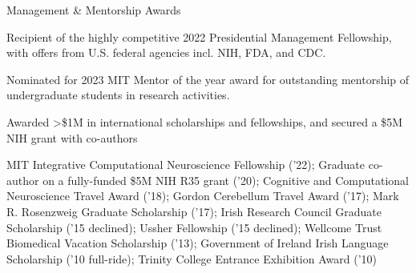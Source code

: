 
\begin{cventries}
  \cventry
    {Management \& Mentorship Awards}
    {} %
    {}
    {} %
    {
      \begin{cvitems} 
        \item {Recipient of the highly competitive 2022 Presidential Management Fellowship, with offers from U.S. federal agencies incl. NIH, FDA, and CDC.}
        \item {Nominated for 2023 MIT Mentor of the year award for outstanding mentorship of undergraduate students in research activities.}
\end{cvitems}
    }
    
  \cventry
    {Awarded >\$1M in international scholarships and fellowships, and secured a \$5M NIH grant with co-authors}
    {} %
    {}
    {} %
    {
      \begin{cvitems} 
		\item {MIT Integrative Computational Neuroscience Fellowship ('22); Graduate co-author on a fully-funded \$5M NIH R35 grant ('20); Cognitive and Computational Neuroscience Travel Award ('18); Gordon Cerebellum Travel Award ('17);  Mark R. Rosenzweig Graduate Scholarship ('17); Irish Research Council Graduate Scholarship ('15 declined); Ussher Fellowship ('15 declined); Wellcome Trust Biomedical Vacation Scholarship ('13); Government of Ireland Irish Language Scholarship ('10 full-ride); Trinity College Entrance Exhibition Award ('10)}
\end{cvitems}
    }
    
\end{cventries}
